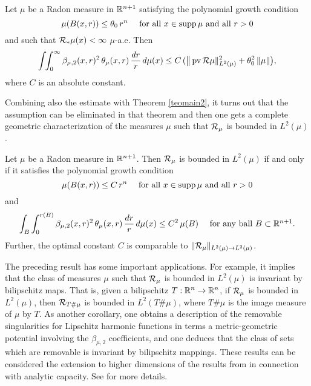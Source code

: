 \begin{theorem*}
	Let $\mu$ be a Radon measure in ${\mathbb R}^{n+1}$ satisfying the polynomial growth condition
	\begin{equation*}
		\mu(B(x,r))\leq \theta_0\,r^n\quad \mbox{ for all $x\in\operatorname{supp}\mu$ and all $r>0$}
	\end{equation*}
	and such that ${\mathcal R}_*\mu(x)<\infty$ $\mu$-a.e.
	Then
	\begin{equation*}
		\int\!\!\int_0^\infty \beta_{\mu,2}(x,r)^2\,\theta_\mu(x,r)\,\frac{dr}r\,d\mu(x)\leq C\,(\big\|\operatorname{pv}{\mathcal R}\mu\|_{L^2(\mu)}^2
		+\theta_0^2\,\|\mu\|\big),
	\end{equation*}
	where $C$ is an absolute constant.
\end{theorem*}

Combining also the estimate  with Theorem \ref{teomain2}, it turns out that the assumption
 can be eliminated in that theorem and then one gets a complete geometric characterization of the measures $\mu$ such that ${\mathcal R}_\mu$ is bounded in $L^2(\mu)$.

\begin{theorem*}
	Let $\mu$ be a Radon measure in ${\mathbb R}^{n+1}$. Then ${\mathcal R}_\mu$ is bounded in $L^2(\mu)$ if and
	only if it satisfies the polynomial growth condition
	$$
	\mu(B(x,r))\leq C\,r^n\quad \mbox{ for all $x\in\operatorname{supp}\mu$ and all $r>0$}
	$$
	and
	$$
	\int_B\int_0^{r(B)} \beta_{\mu,2}(x,r)^2\,\theta_\mu(x,r)\,\frac{dr}r\,d\mu(x)\leq C^2\,\mu(B)\quad\mbox{ for any ball
		$B\subset{\mathbb R}^{n+1}$.}
	$$
	Further, the optimal constant $C$ is comparable to $\|{\mathcal R}_\mu\|_{L^2(\mu)\to L^2(\mu)}$.\end{theorem*}

The preceding result has some important applications. For example, it implies that the class 
of measures $\mu$ such that ${\mathcal R}_\mu$ is bounded in $L^2(\mu)$ is invariant by bilipschitz maps. That is, given a bilipschitz $T:{\mathbb R}^n\to{\mathbb R}^n$, if ${\mathcal R}_\mu$ is bounded in $L^2(\mu)$, then ${\mathcal R}_{T\#\mu}$ is bounded in $L^2(T\#\mu)$, where 
$T\#\mu$ is the image measure of $\mu$ by $T$. As another corollary, one obtains a description of the removable singularities for Lipschitz harmonic functions in terms a metric-geometric potential
involving the $\beta_{\mu,2}$ coefficients, and one deduces that the class of sets which are removable
is invariant by bilipschitz mappings. 
These results can be considered the extension to higher dimensions of the results from 
\cite{Tolsa-bilip} in connection with analytic capacity.
See \cite{Tolsa-riesz} for more details.

